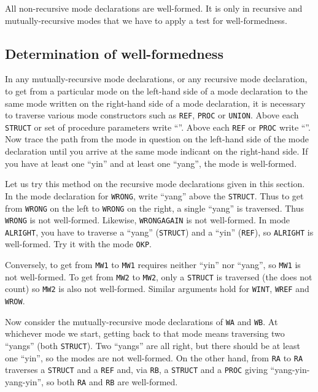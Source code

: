 All non-recursive mode declarations are well-formed. It is only in
recursive and mutually-recursive modes that we have to apply a test
for well-formedness.

\subsection*{Determination of well-formedness}
In any mutually-recursive mode declarations, or any recursive mode
declaration, to get from a particular mode on the left-hand side of
a mode declaration to the same mode 
written on the right-hand side of a mode declaration, it is necessary
to traverse various mode constructors such as \verb|REF|, \verb|PROC|
or \verb|UNION|. Above each \verb|STRUCT| or set of procedure
parameters write ``''. Above each \verb|REF| or \verb|PROC|
write ``''. Now trace the path from the mode in question on
the left-hand side of the mode declaration until you arrive at the
same mode indicant on the right-hand side.  If you have at least one
``yin'' and at least one ``yang'', the mode is well-formed.

Let us try this method on the recursive mode declarations given in
this section. In the mode declaration for \verb|WRONG|, write
``yang'' above the \verb|STRUCT|. Thus to get from \verb|WRONG| on
the left to \verb|WRONG| on the right, a single ``yang'' is
traversed. Thus \verb|WRONG| is not well-formed. Likewise,
\verb|WRONGAGAIN| is not well-formed.  In mode \verb|ALRIGHT|, you
have to traverse a ``yang'' (\verb|STRUCT|) and a ``yin''
(\verb|REF|), so \verb|ALRIGHT| is well-formed.  Try it with the mode
\verb|OKP|.

Conversely, to get from \verb|MW1| to \verb|MW1| requires neither
``yin'' nor ``yang'', so \verb|MW1| is not well-formed. To get from
\verb|MW2| to \verb|MW2|, only a \verb|STRUCT| is traversed (the
 does not count) so \verb|MW2| is also not well-formed.
Similar arguments hold for \verb|WINT|, \verb|WREF| and \verb|WROW|.

Now consider the mutually-recursive mode declarations of \verb|WA| and
\verb|WB|. At whichever mode we start, getting back to that mode means
traversing two ``yangs'' (both \verb|STRUCT|). Two ``yangs'' are all
right, but there should be at least one ``yin'', so the modes are not
well-formed.  On the other hand, from \verb|RA| to \verb|RA| traverses
a \verb|STRUCT| and a \verb|REF| and, via \verb|RB|, a \verb|STRUCT|
and a \verb|PROC| giving ``yang-yin-yang-yin'', so both \verb|RA| and
\verb|RB| are well-formed.

